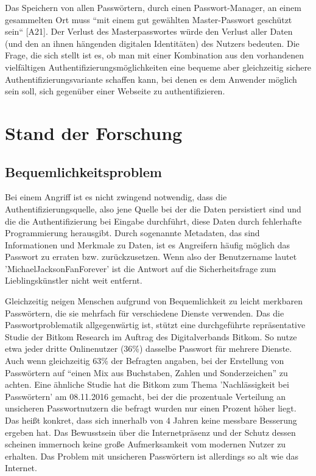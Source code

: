 Das Speichern von allen Passwörtern, durch einen Passwort-Manager, an einem gesammelten Ort muss ``mit einem gut gewählten Master-Passwort geschützt sein`` [A21]. Der Verlust des Masterpasswortes würde den Verlust aller Daten (und den an ihnen hängenden digitalen Identitäten) des Nutzers bedeuten. Die Frage, die sich stellt ist es, ob man mit einer Kombination aus den vorhandenen vielfältigen Authentifizierungsmöglichkeiten eine bequeme aber gleichzeitig sichere Authentifizierungsvariante schaffen kann, bei denen es dem Anwender möglich sein soll, sich gegenüber einer Webseite zu authentifizieren.

\section{Stand der Forschung}
\subsection{Bequemlichkeitsproblem}
Bei einem Angriff ist es nicht zwingend notwendig, dass die Authentifizierungsquelle, also jene Quelle bei der die Daten persistiert sind und die die Authentifizierung bei Eingabe durchführt, diese Daten durch fehlerhafte Programmierung herausgibt. Durch sogenannte Metadaten, das sind Informationen und Merkmale zu Daten, ist es Angreifern häufig möglich das Passwort zu erraten bzw. zurückzusetzen. Wenn also der Benutzername lautet 'MichaelJacksonFanForever' ist die Antwort auf die Sicherheitsfrage zum Lieblingskünstler nicht weit entfernt.

Gleichzeitig neigen Menschen aufgrund von Bequemlichkeit zu leicht merkbaren Passwörtern, die sie mehrfach für verschiedene Dienste verwenden. Das die Passwortproblematik allgegenwärtig ist, stützt eine durchgeführte repräsentative Studie der Bitkom Research \cite{A1} im Auftrag des Digitalverbands Bitkom. So nutze etwa jeder dritte Onlinenutzer (36\%) dasselbe Passwort für mehrere Dienste. Auch wenn gleichzeitig 63\% der Befragten angaben, bei der Erstellung von Passwörtern auf ``einen Mix aus Buchstaben, Zahlen und Sonderzeichen'' \cite{A1} zu achten. Eine ähnliche Studie hat die Bitkom zum Thema 'Nachlässigkeit bei Passwörtern' am 08.11.2016 \cite{A2} gemacht, bei der die prozentuale Verteilung an unsicheren Passwortnutzern die befragt wurden nur einen Prozent höher liegt. Das heißt konkret, dass sich innerhalb von 4 Jahren keine messbare Besserung ergeben hat. Das Bewusstsein über die Internetpräsenz und der Schutz dessen scheinen immernoch keine große Aufmerksamkeit vom modernen Nutzer zu erhalten. Das Problem mit unsicheren Passwörtern ist allerdings so alt wie das Internet.

